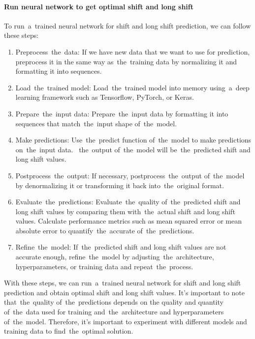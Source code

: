         \\
        \textbf{Run neural network to get optimal shift and long shift}\\
        \\
        To run~a~trained neural network for shift and long shift prediction, we can follow these steps:
        \begin{enumerate}
            \item Preprocess~the~data: If we have new data that we want to use for prediction, preprocess it in the
            same way as~the~training data by normalizing it and formatting it into sequences.
            \item Load~the~trained model: Load~the~trained model into memory using~a~deep learning framework such as
            Tensorflow, PyTorch, or Keras.
            \item Prepare~the~input data: Prepare~the~input data by formatting it into sequences that match~the~input
            shape of~the~model.
            \item Make predictions: Use~the~predict function of~the~model to make predictions on~the~input data.
           ~the~output of~the~model will be~the~predicted shift and long shift values.
            \item Postprocess~the~output: If necessary, postprocess~the~output of~the~model by denormalizing it or
            transforming it back into~the~original format.
            \item Evaluate~the~predictions: Evaluate~the~quality of~the~predicted shift and long shift values by
            comparing them with~the~actual shift and long shift values. Calculate performance metrics such as mean
            squared error or mean absolute error to quantify~the~accurate of~the~predictions.
            \item Refine~the~model: If~the~predicted shift and long shift values are not accurate enough,
            refine~the~model by adjusting~the~architecture, hyperparameters, or training data and repeat~the~process.
        \end{enumerate}
        With these steps, we can run~a~trained neural network for shift and long shift prediction and obtain optimal
        shift and long shift values. It's important to note that~the~quality of~the~predictions depends on the
        quality and quantity of~the~data used for training and~the~architecture and hyperparameters of~the~model.
        Therefore, it's important to experiment with different models and training data to find~the~optimal solution.
